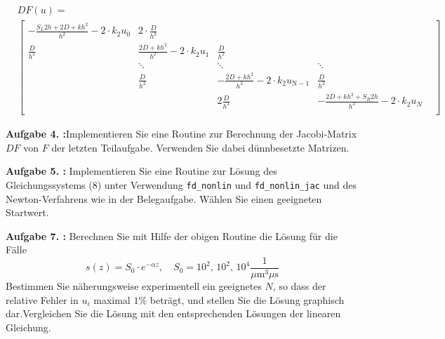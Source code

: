 \begin{align}
		&DF(u)\mathrm= \\
		&\begin{bmatrix}
			-	\frac{S_L2h+2D+kh^2}{h^2}-2\cdot k_2u_0	& 2\cdot \frac{D}{h^2} &   \\
			\frac{D}{h^2}&  \frac{2D+kh^2}{h^2}-2\cdot k_2 u_\mathrm{1} &  \frac{D}{h^2}   \\
			&\ddots & \ddots & \ddots &  \\
			&	\frac{D}{h^2}& - \frac{2D+kh^2}{h^2}-2\cdot k_2 u_\mathrm{N-1} &  \frac{D}{h^2}  \\	
			&		&2\frac{D}{h^2}	&	-\frac{2D+kh^2+S_R2h}{h^2}-2\cdot k_2u_N \\	
		\end{bmatrix}
\end{align}

\begin{mybox}
	\textbf{Aufgabe 4. :}Implementieren Sie eine Routine zur Berechnung der Jacobi-Matrix $DF$ von $F$ der letzten Teilaufgabe.
	Verwenden Sie dabei dünnbesetzte Matrizen.
\end{mybox}



\begin{mybox}
	\textbf{Aufgabe 5. :} 
	Implementieren Sie eine Routine zur Lösung des Gleichungssystems (8) unter Verwendung \verb*|fd_nonlin|
	und \verb*|fd_nonlin_jac| und des Newton-Verfahrens wie in der Belegaufgabe. Wählen Sie einen geeigneten
	Startwert.
\end{mybox}


\begin{mybox}
	\textbf{Aufgabe 7. :}	Berechnen Sie mit Hilfe der obigen Routine die Lösung für die Fälle 
	\begin{equation}
		s(z)=S_0\cdot e^{-\alpha z}, \quad S_0=10^2, \, 10^2, \, 10^4 \frac{1}{\si{\mu\meter^3 \mu \s}}
	\end{equation}
	Bestimmen Sie näherungsweise experimentell ein geeignetes $N$, so dass der relative Fehler in $u_i$
	maximal $1\%$ beträgt, und stellen Sie die Lösung graphisch dar.Vergleichen Sie die Lösung mit den
	entsprechenden Lösungen der linearen Gleichung.
\end{mybox}



